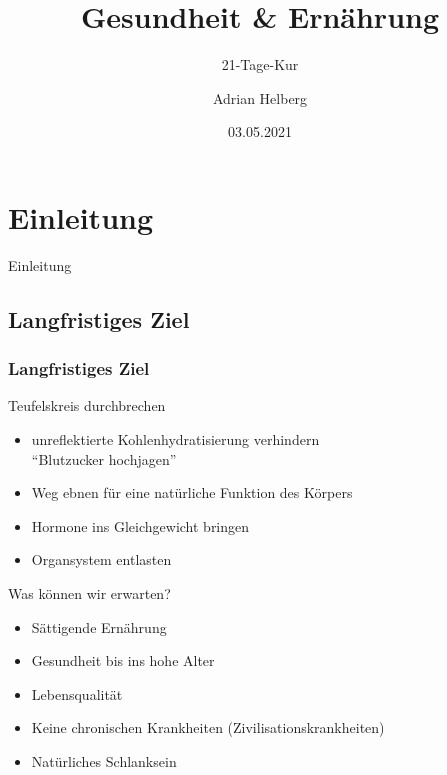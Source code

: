 \documentclass[xcolor=dvipsnames]{beamer}
\title{Gesundheit \& Ernährung}
\subtitle{21-Tage-Kur}
\author{Adrian Helberg}
\date{03.05.2021}
\begin{document}
    \maketitle


    \section{Einleitung}
    {
        \begin{frame}
            \begin{center}
                \Huge Einleitung
            \end{center}
        \end{frame}
    }

    \subsection{Langfristiges Ziel}
    \begin{frame}[allowframebreaks]
        \frametitle{Langfristiges Ziel}
        \begin{block}{Teufelskreis durchbrechen}
            \begin{itemize}
                \setlength\itemsep{1em}
                \item unreflektierte Kohlenhydratisierung verhindern\\ "`Blutzucker hochjagen"'
                \item Weg ebnen für eine natürliche Funktion des Körpers
                \item Hormone ins Gleichgewicht bringen
                \item Organsystem entlasten
            \end{itemize}
        \end{block}

        \framebreak

        \begin{block}{Was können wir erwarten?}
            \begin{itemize}
                \setlength\itemsep{1em}
                \item Sättigende Ernährung
                \item Gesundheit bis ins hohe Alter
                \item Lebensqualität
                \item Keine chronischen Krankheiten (Zivilisationskrankheiten)
                \item Natürliches Schlanksein
            \end{itemize}
        \end{block}
    \end{frame}
\end{document}
